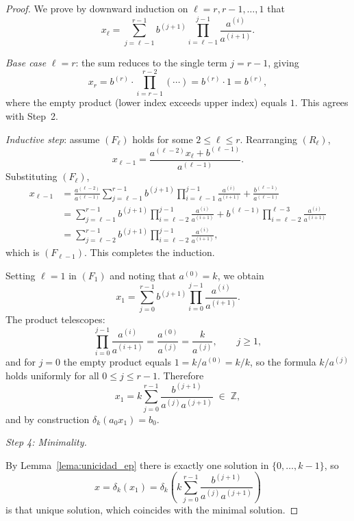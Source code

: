 \documentclass[12pt]{article}
\begin{document}
\begin{proof}
We prove by downward induction on $\ell = r, r-1, \dots, 1$ that
\[
x_\ell
=
\sum_{j=\ell-1}^{r-1}
b^{(j+1)}
\prod_{i=\ell-1}^{j-1}
\frac{a^{(i)}}{a^{(i+1)}}.
\tag{$F_\ell$}
\]

\textit{Base case} $\ell = r$: the sum reduces to the single term
$j = r-1$, giving
\[
x_r = b^{(r)} \cdot \prod_{i=r-1}^{r-2}(\cdots) = b^{(r)} \cdot 1 = b^{(r)},
\]
where the empty product (lower index exceeds upper index) equals $1$.
This agrees with Step~2.

\textit{Inductive step}: assume $(F_\ell)$ holds for some
$2 \le \ell \le r$.
Rearranging $(R_\ell)$,
\[
x_{\ell-1}
=
\frac{a^{(\ell-2)} x_\ell + b^{(\ell-1)}}{a^{(\ell-1)}}.
\]
Substituting $(F_\ell)$,
\begin{align*}
x_{\ell-1}
&=
\frac{a^{(\ell-2)}}{a^{(\ell-1)}}
\sum_{j=\ell-1}^{r-1}
b^{(j+1)}
\prod_{i=\ell-1}^{j-1}
\frac{a^{(i)}}{a^{(i+1)}}
+
\frac{b^{(\ell-1)}}{a^{(\ell-1)}}
\\
&=
\sum_{j=\ell-1}^{r-1}
b^{(j+1)}
\prod_{i=\ell-2}^{j-1}
\frac{a^{(i)}}{a^{(i+1)}}
+
b^{(\ell-1)}
\prod_{i=\ell-2}^{\ell-3}
\frac{a^{(i)}}{a^{(i+1)}}
\\
&=
\sum_{j=\ell-2}^{r-1}
b^{(j+1)}
\prod_{i=\ell-2}^{j-1}
\frac{a^{(i)}}{a^{(i+1)}},
\end{align*}
which is $(F_{\ell-1})$. This completes the induction.

Setting $\ell = 1$ in $(F_1)$ and noting that $a^{(0)} = k$, we obtain
\[
x_1
=
\sum_{j=0}^{r-1}
b^{(j+1)}
\prod_{i=0}^{j-1}
\frac{a^{(i)}}{a^{(i+1)}}.
\]
The product telescopes:
\[
\prod_{i=0}^{j-1}
\frac{a^{(i)}}{a^{(i+1)}}
=
\frac{a^{(0)}}{a^{(j)}}
=
\frac{k}{a^{(j)}},
\qquad j \ge 1,
\]
and for $j = 0$ the empty product equals $1 = k/a^{(0)} = k/k$,
so the formula $k/a^{(j)}$ holds uniformly for all $0 \le j \le r-1$.
Therefore
\[
x_1
=
k \sum_{j=0}^{r-1}
\frac{b^{(j+1)}}{a^{(j)} a^{(j+1)}}
\;\in\; \mathbb{Z},
\]
and by construction $\delta_k(a_0 x_1) = b_0$.

\medskip
\textit{Step 4: Minimality.}

By Lemma~\ref{lema:unicidad_ep} there is exactly one solution in
$\{0,\dots,k-1\}$, so
\[
x = \delta_k(x_1)
=
\delta_k\!\left(
k\sum_{j=0}^{r-1}
\frac{b^{(j+1)}}{a^{(j)}a^{(j+1)}}
\right)
\]
is that unique solution, which coincides with the minimal solution.
\end{proof}
\end{document}
